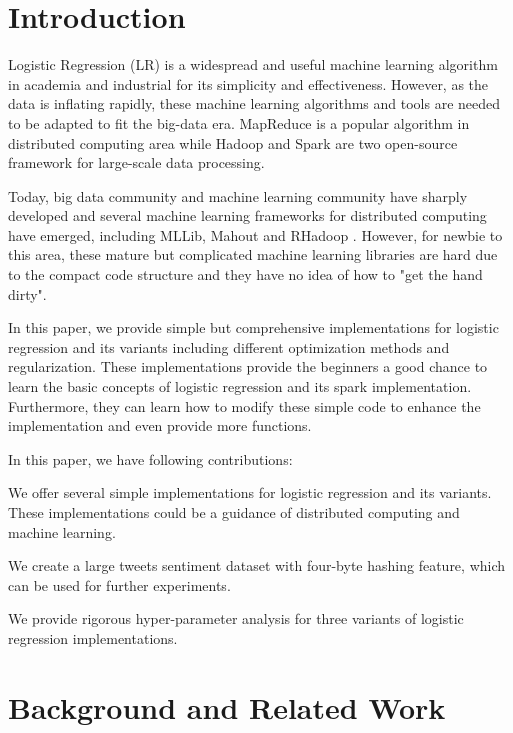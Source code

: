 \documentclass[sigconf]{acmart}
\begin{document}
\section{Introduction}
\label{sec:introduction}

Logistic Regression (LR) is a widespread and useful machine learning algorithm in academia and industrial for its simplicity and effectiveness. However, as the data is inflating rapidly, these machine learning algorithms and tools are needed to be adapted to fit the big-data era. MapReduce \cite{dean2008mapreduce} is a popular algorithm in distributed computing area while Hadoop \cite{shvachko2010hadoop} and Spark \cite{zaharia2010spark} are two open-source framework for large-scale data processing. 

Today, big data community and machine learning community have sharply developed and several machine learning frameworks for distributed computing have emerged, including MLLib, Mahout and RHadoop \cite{witten2016data}. However, for newbie to this area, these mature but complicated machine learning libraries are hard due to the compact code structure and they have no idea of how to "get the hand dirty". 

In this paper, we provide simple but comprehensive implementations for logistic regression and its variants including different optimization methods and regularization. These implementations provide the beginners a good chance to learn the basic concepts of logistic regression and its spark implementation. Furthermore, they can learn how to modify these simple code to enhance the implementation and even provide more functions. 

In this paper, we have following contributions:

We offer several simple implementations for logistic regression and its variants. These implementations could be a guidance of distributed computing and machine learning. 

We create a large tweets sentiment dataset with four-byte hashing feature, which can be used for further experiments.

We provide rigorous hyper-parameter analysis for three variants of logistic regression implementations.

\section{Background and Related Work}
\label{sec:relatedWork}
\end{document}
